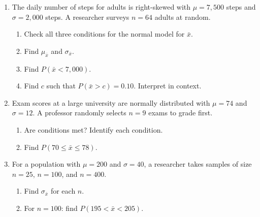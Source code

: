 \documentclass[10pt]{article}
\begin{document}
\namedateperiod

\vspace{0.15in}

\begin{enumerate}

  \item The daily number of steps for adults is right-skewed with $\mu = 7{,}500$ steps
        and $\sigma = 2{,}000$ steps. A researcher surveys $n = 64$ adults at random.
        \begin{enumerate}[label=\alph*.]
          \item Check all three conditions for the normal model for $\bar{x}$.
          \item Find $\mu_{\bar{x}}$ and $\sigma_{\bar{x}}$.
                \vspace{0.5in}
          \item Find $P(\bar{x} < 7{,}000)$.
                \vspace{0.9in}
          \item Find $c$ such that $P(\bar{x} > c) = 0.10$. Interpret in context.
                \vspace{0.9in}
        \end{enumerate}

  \item Exam scores at a large university are normally distributed with $\mu = 74$ and
        $\sigma = 12$. A professor randomly selects $n = 9$ exams to grade first.
        \begin{enumerate}[label=\alph*.]
          \item Are conditions met? Identify each condition.
          \item Find $P(70 \le \bar{x} \le 78)$.
                \vspace{0.9in}
        \end{enumerate}

  \item For a population with $\mu = 200$ and $\sigma = 40$, a researcher takes samples
        of size $n = 25$, $n = 100$, and $n = 400$.
        \begin{enumerate}[label=\alph*.]
          \item Find $\sigma_{\bar{x}}$ for each $n$.
                \vspace{0.5in}
          \item For $n = 100$: find $P(195 < \bar{x} < 205)$.
                \vspace{0.9in}
        \end{enumerate}

\end{enumerate}
\end{document}
